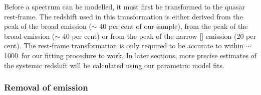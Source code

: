 Before a spectrum can be modelled, it must first be transformed to the quasar rest-frame.  
The redshift used in this transformation is either derived from the peak of the broad \ha emission ($\sim$ 40 per cent of our sample), from the peak of the broad \hb emission ($\sim$ 40 per cent) or from the peak of the narrow [] emission (20 per cent).
The rest-frame transformation is only required to be accurate to within $\sim$1000\kms\, for our fitting procedure to work. 
In later sections, more precise estimates of the systemic redshift will be calculated using our parametric model fits. 

\subsubsection{Removal of  emission}

